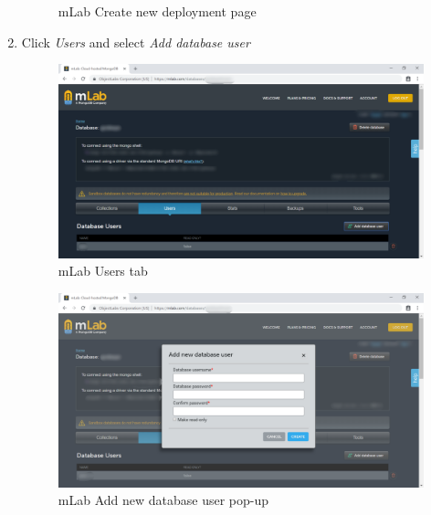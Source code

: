 \begin{enumerate}
\begin{center}
\begin{figure}[H]
	      		\caption{mLab Create new deployment page}
	      	\end{figure}
	      \end{center}
	\item Click \textit{Users} and select \textit{Add database user}
	      \begin{center}
	      	\begin{figure}[H]
	      		\centering
	      		\includegraphics[width=0.6\columnwidth]{images/appendixA/mLab-create-user.png}
	      		\caption{mLab Users tab}
	      	\end{figure}
	      \end{center}
	      \begin{center}
	      	\begin{figure}[H]
	      		\centering
	      		\includegraphics[width=0.6\columnwidth]{images/appendixA/mLab-create-user-2.png}
	      		\caption{mLab Add new database user pop-up}
	      	\end{figure}
	      \end{center}
\end{enumerate}

